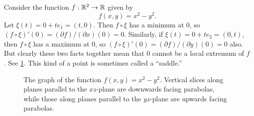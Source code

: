 \begin{example} \label{saddle}
	Consider the function $f : \mathbb{R}^2 \to \mathbb{R}$ given by \[ f(x, y) = x^2 - y^2. \]
	Let $\xi(t) = 0 + te_1 = (t, 0)$. Then $f \circ \xi$ has a minimum at 0, so $(f \circ \xi)'(0) = (\partial f)/(\partial x)(0) = 0$. Similarly, if $\xi(t) = 0 + te_2 = (0, t)$, then $f \circ \xi$ has a maximum at 0, so $(f \circ \xi)'(0) = (\partial f)/(\partial y)(0) = 0$ also. But clearly these two facts together mean that 0 cannot be a local extremum of $f$. See \cref{saddle-graph}. This kind of a point is sometimes called a ``saddle.''
	\begin{figure}[ht]
		\begin{center}
		\end{center}
		\caption{The graph of the function  $f(x,y) = x^2 - y^2$. Vertical slices along planes parallel to the $xz$-plane are downwards facing parabolas, while those along planes parallel to the $yz$-plane are upwards facing parabolas.} \label{saddle-graph}
	\end{figure}
\end{example}

